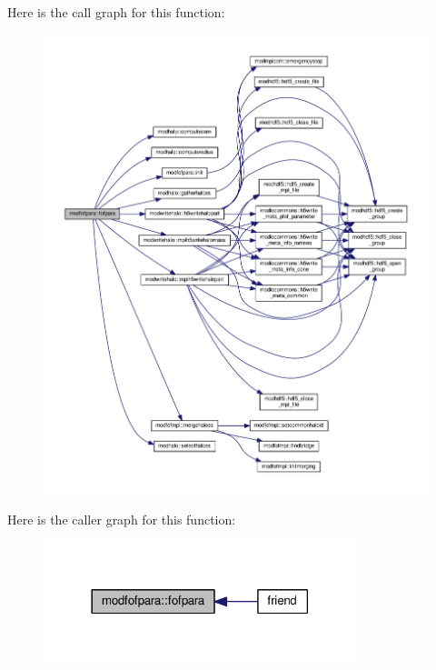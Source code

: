 Here is the call graph for this function\+:\nopagebreak
\begin{figure}[H]
\begin{center}
\leavevmode
\includegraphics[width=350pt]{namespacemodfofpara_a0e76e564f41683dc0c0104fc789718b0_cgraph}
\end{center}
\end{figure}




Here is the caller graph for this function\+:\nopagebreak
\begin{figure}[H]
\begin{center}
\leavevmode
\includegraphics[width=258pt]{namespacemodfofpara_a0e76e564f41683dc0c0104fc789718b0_icgraph}
\end{center}
\end{figure}


